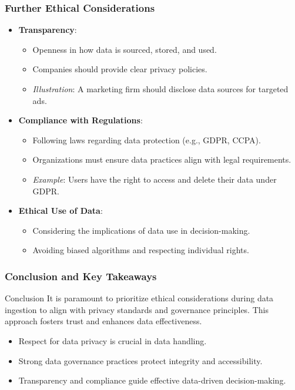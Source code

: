 \documentclass[aspectratio=169]{beamer}
\begin{document}
\begin{frame}[fragile]
    \frametitle{Further Ethical Considerations}
    \begin{itemize}
        \item \textbf{Transparency}:
        \begin{itemize}
            \item Openness in how data is sourced, stored, and used.
            \item Companies should provide clear privacy policies.
            \item \textit{Illustration}: A marketing firm should disclose data sources for targeted ads.
        \end{itemize}

        \item \textbf{Compliance with Regulations}:
        \begin{itemize}
            \item Following laws regarding data protection (e.g., GDPR, CCPA).
            \item Organizations must ensure data practices align with legal requirements.
            \item \textit{Example}: Users have the right to access and delete their data under GDPR.
        \end{itemize}

        \item \textbf{Ethical Use of Data}:
        \begin{itemize}
            \item Considering the implications of data use in decision-making.
            \item Avoiding biased algorithms and respecting individual rights.
        \end{itemize}
    \end{itemize}
\end{frame}

\begin{frame}[fragile]
    \frametitle{Conclusion and Key Takeaways}
    \begin{block}{Conclusion}
        It is paramount to prioritize ethical considerations during data ingestion to align with privacy standards and governance principles. This approach fosters trust and enhances data effectiveness.
    \end{block}
    
    \begin{itemize}
        \item Respect for data privacy is crucial in data handling.
        \item Strong data governance practices protect integrity and accessibility.
        \item Transparency and compliance guide effective data-driven decision-making.
    \end{itemize}
\end{frame}
\end{document}
